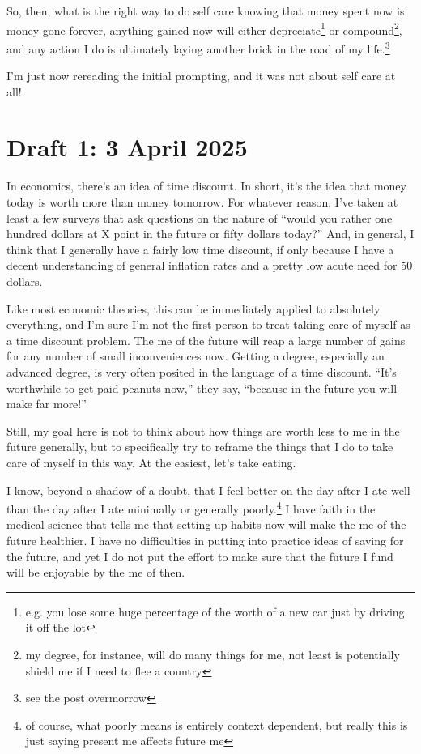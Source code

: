 \documentclass[12pt]{article}[titlepage]
\newcommand{\say}[1]{``#1''}
\newcommand{\1}{\={a}}
\newcommand{\2}{\={e}}
\newcommand{\3}{\={\i}}
\newcommand{\4}{\=o}
\newcommand{\5}{\=u}
\newcommand{\6}{\={A}}
\renewcommand{\,}{\textsuperscript{,}}
\begin{document}
So, then, what is the right way to do self care knowing that money spent now is money gone forever, anything gained now will either depreciate\footnote{e.g. you lose some huge percentage of the worth of a new car just by driving it off the lot} or compound\footnote{my degree, for instance, will do many things for me, not least is potentially shield me if I need to flee a country}, and any action I do is ultimately laying another brick in the road of my life.\footnote{see the post overmorrow}

I'm just now rereading the initial prompting, and it was not about self care at all!.

\section{Draft 1: 3 April 2025}  
In economics, there's an idea of time discount.  
In short, it's the idea that money today is worth more than money tomorrow.  
For whatever reason, I've taken at least a few surveys that ask questions on the nature of \say{would you rather one hundred dollars at X point in the future or fifty dollars today?}  
And, in general, I think that I generally have a fairly low time discount, if only because I have a decent understanding of general inflation rates and a pretty low acute need for 50 dollars.

Like most economic theories, this can be immediately applied to absolutely everything, and I'm sure I'm not the first person to treat taking care of myself as a time discount problem.  
The me of the future will reap a large number of gains for any number of small inconveniences now.  
Getting a degree, especially an advanced degree, is very often posited in the language of a time discount.  
\say{It's worthwhile to get paid peanuts now,} they say, \say{because in the future you will make far more!}

Still, my goal here is not to think about how things are worth less to me in the future generally, but to specifically try to reframe the things that I do to take care of myself in this way.  
At the easiest, let's take eating.

I know, beyond a shadow of a doubt, that I feel better on the day after I ate well than the day after I ate minimally or generally poorly.\footnote{of course, what poorly means is entirely context dependent, but really this is just saying present me affects future me}  
I have faith in the medical science that tells me that setting up habits now will make the me of the future healthier.  
I have no difficulties in putting into practice ideas of saving for the future, and yet I do not put the effort to make sure that the future I fund will be enjoyable by the me of then.
\end{document}
